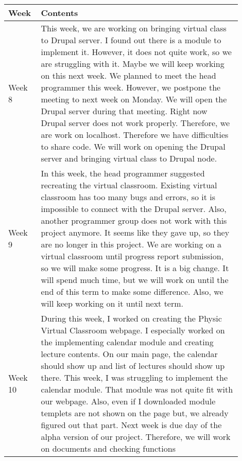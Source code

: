 \documentclass[10pt]{article}
\begin{document}
\begin{center}
            \begin{tabular}{ | p{0.1\linewidth} | p{0.8\linewidth} | } \hline
                Week & Contents  \\ \hline
                Week 8 & This week, we are working on bringing virtual class to Drupal server. I found out there is a module to implement it.  However, it does not quite work, so we are struggling with it. Maybe we will keep working on this next week. We planned to meet the head programmer this week. However, we postpone the meeting to next week on Monday. We will open the Drupal server during that meeting. Right now Drupal server does not work properly. Therefore, we are work on localhost. Therefore we have difficulties to share code. We will work on opening the Drupal server and bringing virtual class to Drupal node.   \\ \hline
                Week 9 & In this week, the head programmer suggested recreating the virtual classroom. Existing virtual classroom has too many bugs and errors, so it is impossible to connect with the Drupal server. Also, another programmer group does not work with this project anymore. It seems like they gave up, so they are no longer in this project. We are working on a virtual classroom until progress report submission, so we will make some progress. It is a big change. It will spend much time, but we will work on until the end of this term to make some difference. Also, we will keep working on it until next term.   \\ \hline
                Week 10 & During this week, I worked on creating the Physic Virtual Classroom webpage. I especially worked on the implementing calendar module and creating lecture contents. On our main page, the calendar should show up and list of lectures should show up there. This week, I was struggling to implement the calendar module. That module was not quite fit with our webpage. Also, even if I downloaded module templets are not shown on the page but, we already figured out that part. Next week is due day of the alpha version of our project. Therefore, we will work on documents and checking functions  \\ \hline
            \end{tabular}
            \end{center}
\end{document}
